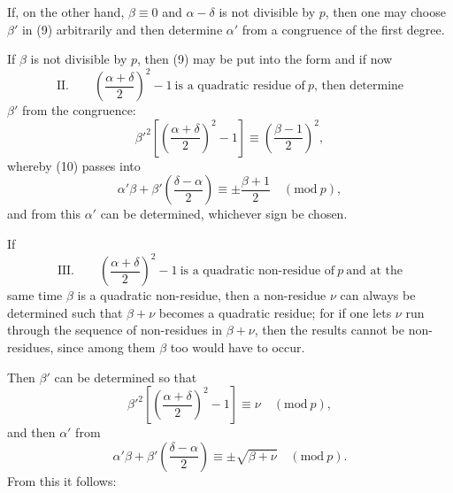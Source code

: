 
If, on the other hand, $\beta \equiv 0$ and $\alpha-\delta$ is not divisible by $p$, then
one may choose $\beta'$ in (9) arbitrarily and then determine $\alpha'$ from a congruence
 of the first degree.

If $\beta$ is not divisible by $p$, then (9) may be put into the form
and if now
\[
\text{II.} \qquad \left(\frac{\alpha+\delta}{2}\right)^2-1 \ \text{is a quadratic residue of}\ p\text{, then determine}
\]
$\beta'$ from the congruence:
\[
\beta'^2\left[\left(\frac{\alpha+\delta}{2}\right)^2-1\right] \equiv \left(\frac{\beta-1}{2}\right)^2,
\]
whereby (10) passes into
\[
\alpha'\beta+\beta'\left(\frac{\delta-\alpha}{2}\right) \equiv \pm \frac{\beta+1}{2} \quad (\mathrm{mod}\ p),
\]
and from this $\alpha'$ can be determined, whichever sign be
chosen.

If
\[
\text{III.} \qquad \left(\frac{\alpha+\delta}{2}\right)^2-1 \ \text{is a quadratic non-residue of}\ p \ \text{and at the}
\]
same time $\beta$ is a quadratic non-residue, then a non-residue
 $\nu$ can always be determined such that $\beta+\nu$ becomes a quadratic residue; for if
one lets $\nu$ run through the sequence of non-residues in $\beta+\nu$, then
the results cannot be  non-residues, since among them
$\beta$ too would have to occur.

Then $\beta'$ can be determined so that
\[
\beta'^2\left[\left(\frac{\alpha+\delta}{2}\right)^2-1\right] \equiv \nu \quad (\mathrm{mod}\ p),
\]
and then $\alpha'$ from
\[
\alpha'\beta+\beta'\left(\frac{\delta-\alpha}{2}\right) \equiv \pm\sqrt{\beta+\nu} \quad (\mathrm{mod}\ p).
\]
From this it follows:



